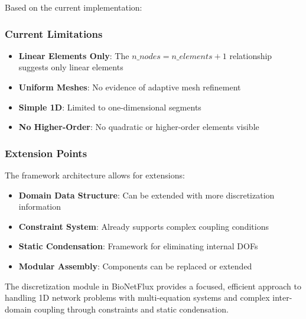 Based on the current implementation:

\subsubsection{Current Limitations}

\begin{itemize}
	\item \textbf{Linear Elements Only}: The $n\_nodes = n\_elements + 1$ relationship suggests only linear elements
	\item \textbf{Uniform Meshes}: No evidence of adaptive mesh refinement
	\item \textbf{Simple 1D}: Limited to one-dimensional segments
	\item \textbf{No Higher-Order}: No quadratic or higher-order elements visible
\end{itemize}

\subsubsection{Extension Points}

The framework architecture allows for extensions:

\begin{itemize}
	\item \textbf{Domain Data Structure}: Can be extended with more discretization information
	\item \textbf{Constraint System}: Already supports complex coupling conditions
	\item \textbf{Static Condensation}: Framework for eliminating internal DOFs
	\item \textbf{Modular Assembly}: Components can be replaced or extended
\end{itemize}

The discretization module in BioNetFlux provides a focused, efficient approach to handling 1D network problems with multi-equation systems and complex inter-domain coupling through constraints and static condensation.